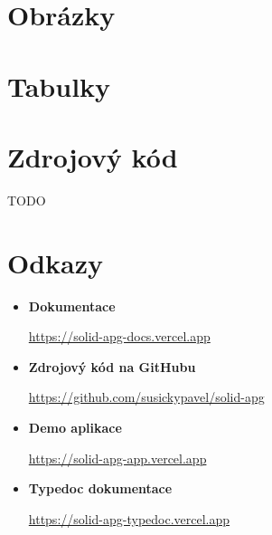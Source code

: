 \documentclass{ctuthesis}
\begin{document}
\printbibliography[keyword={a11y},heading=none]

\chapter{Obrázky}



\chapter{Tabulky}



\chapter{Zdrojový kód}

TODO

\chapter{Odkazy}

\begin{itemize}
    \item \textbf{Dokumentace}

          \url{https://solid-apg-docs.vercel.app}
    \item \textbf{Zdrojový kód na GitHubu}

          \url{https://github.com/susickypavel/solid-apg}
    \item \textbf{Demo aplikace}

          \url{https://solid-apg-app.vercel.app}

    \item \textbf{Typedoc dokumentace}

          \url{https://solid-apg-typedoc.vercel.app}
\end{itemize}
\end{document}

